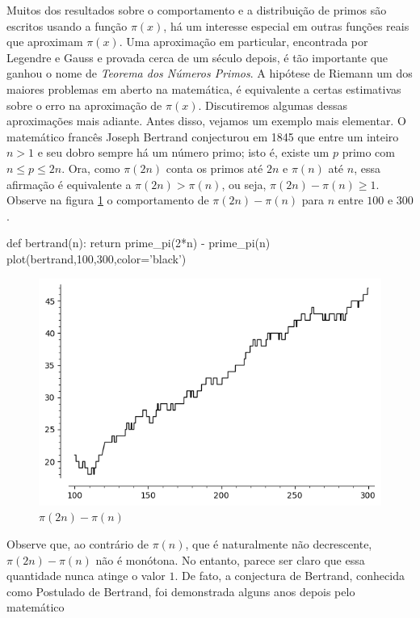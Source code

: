 Muitos dos resultados sobre o comportamento e a distribuição de primos
são escritos usando a função $\pi(x)$, há um interesse especial em outras
funções reais que aproximam $\pi(x)$. Uma aproximação
em particular, encontrada por Legendre e Gauss e 
provada cerca de um século depois, é tão importante que ganhou
o nome de \emph{Teorema dos Números Primos}.
A hipótese de Riemann 
um dos maiores problemas em aberto na matemática, é equivalente
a certas estimativas sobre o erro na aproximação de $\pi(x)$.
Discutiremos algumas dessas aproximações
mais adiante. Antes disso, vejamos um exemplo mais elementar.
O matemático francês Joseph Bertrand conjecturou em 1845 que
entre um inteiro $n>1$ e seu dobro sempre há um número primo;
isto é, existe um $p$ primo com $n\leq p\leq 2n$. Ora, como
$\pi(2n)$ conta os primos até $2n$ e $\pi(n)$ até $n$,
essa afirmação é equivalente a $\pi(2n)>\pi(n)$, ou seja,
$\pi(2n) - \pi(n) \geq 1$.
Observe na figura \ref{fig:bertrand} o comportamento de
$\pi(2n) - \pi(n)$ para $n$ entre $100$ e $300$.
\begin{sageinput}
def bertrand(n):
    return prime_pi(2*n) - prime_pi(n)
plot(bertrand,100,300,color='black')
\end{sageinput}
\begin{figure}[h]
  \centering
  \includegraphics[scale=0.7]{imgs/bertrand.png}
  \caption{$\pi(2n) - \pi(n)$}
  \label{fig:bertrand}
\end{figure}
Observe que, ao contrário de $\pi(n)$, que é naturalmente
não decrescente, ${\pi(2n)-\pi(n)}$ não é monótona. No entanto,
parece ser claro que essa quantidade nunca atinge o valor $1$.
De fato, a conjectura de Bertrand, conhecida como Postulado
de Bertrand, foi demonstrada alguns anos depois pelo matemático
